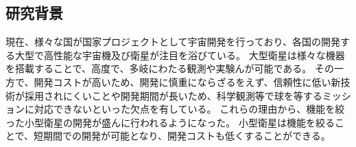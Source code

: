 \subsection{研究背景}
現在、様々な国が国家プロジェクトとして宇宙開発を行っており、各国の開発する大型で高性能な宇宙機及び衛星が注目を浴びている。
大型衛星は様々な機器を搭載することで、高度で、多岐にわたる観測や実験んが可能である。
その一方で、開発コストが高いため、開発に慎重にならざるをえず、信頼性に低い新技術が採用されにくいことや開発期間が長いため、科学観測等で球を等するミッションに対応できないといった欠点を有している。
これらの理由から、機能を絞った小型衛星の開発が盛んに行われるようになった。
小型衛星は機能を絞ることで、短期間での開発が可能となり、開発コストも低くすることができる。

